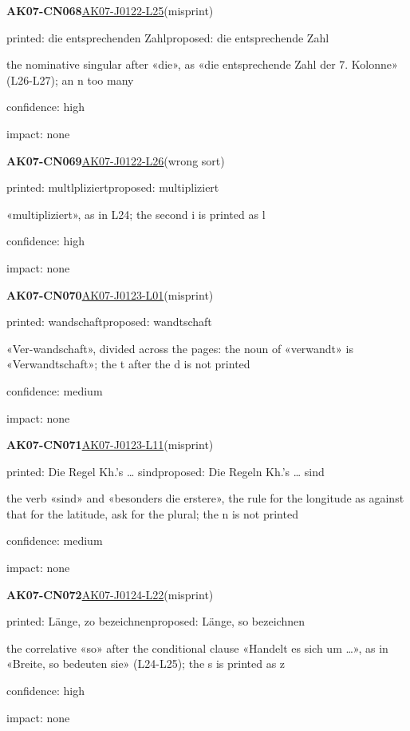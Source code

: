 \documentclass[11pt]{article}
\begin{document}
\noindent\textbf{AK07-CN068}\enspace\hyperlink{AK07-J0122-L25}{AK07-J0122-L25}\enspace(misprint)\par\noindent printed: die entsprechenden Zahl\enspace proposed: die entsprechende Zahl\par\noindent the nominative singular after «die», as «die entsprechende Zahl der 7. Kolonne» (L26-L27); an n too many\par\noindent confidence: high\par\noindent impact: none\par\medskip
\noindent\textbf{AK07-CN069}\enspace\hyperlink{AK07-J0122-L26}{AK07-J0122-L26}\enspace(wrong sort)\par\noindent printed: multlpliziert\enspace proposed: multipliziert\par\noindent «multipliziert», as in L24; the second i is printed as l\par\noindent confidence: high\par\noindent impact: none\par\medskip
\noindent\textbf{AK07-CN070}\enspace\hyperlink{AK07-J0123-L01}{AK07-J0123-L01}\enspace(misprint)\par\noindent printed: wandschaft\enspace proposed: wandtschaft\par\noindent «Ver-wandschaft», divided across the pages: the noun of «verwandt» is «Verwandtschaft»; the t after the d is not printed\par\noindent confidence: medium\par\noindent impact: none\par\medskip
\noindent\textbf{AK07-CN071}\enspace\hyperlink{AK07-J0123-L11}{AK07-J0123-L11}\enspace(misprint)\par\noindent printed: Die Regel Kh.’s … sind\enspace proposed: Die Regeln Kh.’s … sind\par\noindent the verb «sind» and «besonders die erstere», the rule for the longitude as against that for the latitude, ask for the plural; the n is not printed\par\noindent confidence: medium\par\noindent impact: none\par\medskip
\noindent\textbf{AK07-CN072}\enspace\hyperlink{AK07-J0124-L22}{AK07-J0124-L22}\enspace(misprint)\par\noindent printed: Länge, zo bezeichnen\enspace proposed: Länge, so bezeichnen\par\noindent the correlative «so» after the conditional clause «Handelt es sich um …», as in «Breite, so bedeuten sie» (L24-L25); the s is printed as z\par\noindent confidence: high\par\noindent impact: none\par\medskip
\end{document}
